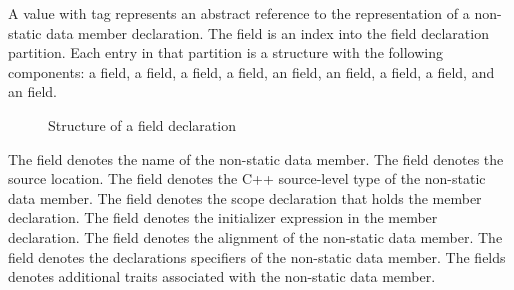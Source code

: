 A  value with tag  represents 
an abstract reference to the representation of a non-static data member declaration.
The  field is an index into the field declaration partition.
Each entry in that partition is a structure with the following components:
a  field, a  field, a  field, a  field,
an  field, an  field, a  field,
a  field, and an  field.
%
\begin{figure}[H]
	\centering
	\caption{Structure of a field declaration}
	\label{fig:ifc-field-decl-structure}
\end{figure}
%
The  field denotes the name of the non-static data member.
The  field denotes the source location.
The  field denotes the C++ source-level type of the non-static data member.
The  field denotes the scope declaration that holds the member declaration.  
The  field denotes the initializer expression in the member declaration.
The  field denotes the alignment of the non-static data member.
The  field denotes the declarations specifiers of the non-static data member.
The  fields denotes additional traits associated with the non-static data member.



\subsection{}
\label{sec:ifc:DeclSort:Bitfield}

